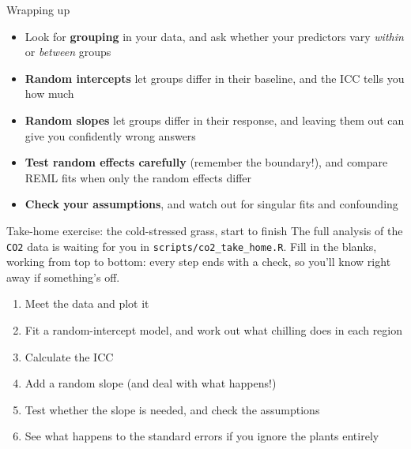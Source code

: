 \documentclass[
  ignorenonframetext,
  aspectratio=169,
]{beamer}
\providecommand{\tightlist}{%
  \setlength{\itemsep}{0pt}\setlength{\parskip}{0pt}}\usepackage{longtable,booktabs,array}
\begin{document}
\begin{frame}{Wrapping up}
\label{wrapping-up}
\begin{itemize}
\tightlist
\item
  Look for \textbf{grouping} in your data, and ask whether your
  predictors vary \emph{within} or \emph{between} groups
\end{itemize}

\pause

\begin{itemize}
\tightlist
\item
  \textbf{Random intercepts} let groups differ in their baseline, and
  the ICC tells you how much
\end{itemize}

\pause

\begin{itemize}
\tightlist
\item
  \textbf{Random slopes} let groups differ in their response, and
  leaving them out can give you confidently wrong answers
\end{itemize}

\pause

\begin{itemize}
\tightlist
\item
  \textbf{Test random effects carefully} (remember the boundary!), and
  compare REML fits when only the random effects differ
\end{itemize}

\pause

\begin{itemize}
\tightlist
\item
  \textbf{Check your assumptions}, and watch out for singular fits and
  confounding
\end{itemize}
\end{frame}

\begin{frame}[fragile]{Take-home exercise: the cold-stressed grass,
start to finish}
\label{take-home-exercise-the-cold-stressed-grass-start-to-finish}
The full analysis of the \texttt{CO2} data is waiting for you in
\texttt{scripts/co2\_take\_home.R}. Fill in the blanks, working from top
to bottom: every step ends with a check, so you'll know right away if
something's off.

\small

\begin{enumerate}
\tightlist
\item
  Meet the data and plot it
\item
  Fit a random-intercept model, and work out what chilling does in each
  region
\item
  Calculate the ICC
\item
  Add a random slope (and deal with what happens!)
\item
  Test whether the slope is needed, and check the assumptions
\item
  See what happens to the standard errors if you ignore the plants
  entirely
\end{enumerate}

\normalsize
\end{frame}
\end{document}
